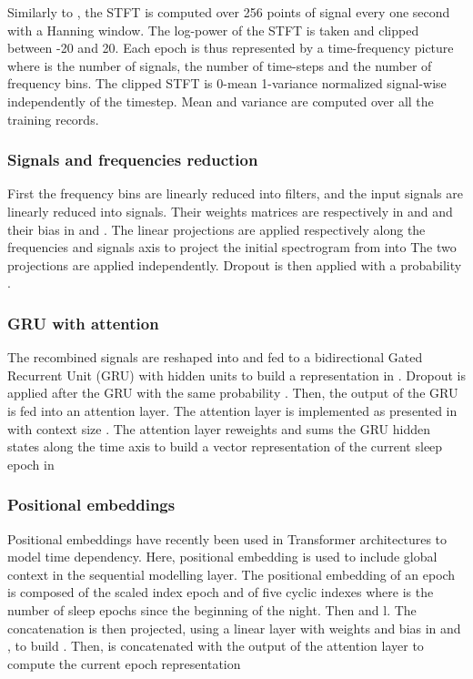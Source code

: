 \documentclass[journal]{IEEEtran}
\begin{document}
Similarly to \cite{Phan2019}, the STFT is computed over 256 points of signal every one second with a Hanning window. The log-power of the STFT is taken and clipped between -20 and 20. Each epoch is thus represented by a time-frequency picture  where  is the number of signals,  the number of time-steps  and  the number of frequency bins. The clipped STFT is 0-mean 1-variance normalized signal-wise independently of the timestep. Mean and variance are computed over all the training records.

\subsubsection{Signals and frequencies reduction}
First the  frequency bins are linearly reduced into  filters, and the  input signals are linearly reduced into  signals. Their weights matrices are respectively in  and  and their bias in  and . The linear projections are applied respectively along the frequencies and signals axis to project the initial spectrogram from  into 
The two projections are applied independently. Dropout is then applied with a probability .
\subsubsection{GRU with attention}
The recombined signals are reshaped into  and fed to a bidirectional Gated Recurrent Unit (GRU) \cite{GRU2014} with  hidden units to build a representation in . Dropout is applied after the GRU with the same probability .
Then, the output of the GRU is fed into an attention layer. The attention layer is implemented as presented in \cite{Luong2015} with context size . The attention layer reweights and sums the GRU hidden states along the time axis to build a vector representation of the current sleep epoch in 

\subsubsection{Positional embeddings}
Positional embeddings have recently been used in Transformer architectures \cite{transformer2017} to model time dependency. Here, positional embedding is used to include global context in the sequential modelling layer. The positional embedding of an epoch is composed of the scaled index epoch  and of five cyclic indexes  where  is the number of sleep epochs since the beginning of the night. Then  and l.
The concatenation  is then projected, using a linear layer with weights and bias in  and , to build .
Then,  is concatenated with the output of the attention layer to compute the current epoch representation 
\end{document}
